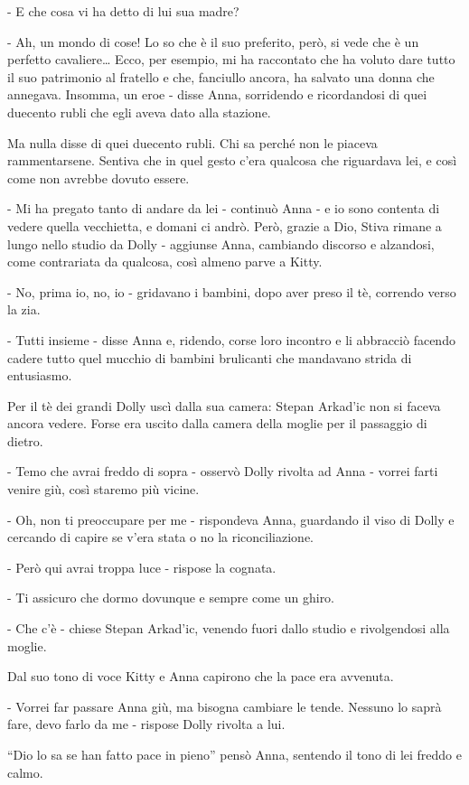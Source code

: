 - E che cosa vi ha detto di lui sua madre? 

- Ah, un mondo di cose! Lo so che è il suo preferito, però, si vede che è un perfetto cavaliere\ldots{} Ecco, per esempio, mi ha raccontato che ha voluto dare tutto il suo patrimonio al fratello e che, fanciullo ancora, ha salvato una donna che annegava. Insomma, un eroe - disse Anna, sorridendo e ricordandosi di quei duecento rubli che egli aveva dato alla stazione. 

Ma nulla disse di quei duecento rubli. Chi sa perché non le piaceva rammentarsene. Sentiva che in quel gesto c'era qualcosa che riguardava lei, e così come non avrebbe dovuto essere. 

- Mi ha pregato tanto di andare da lei - continuò Anna - e io sono contenta di vedere quella vecchietta, e domani ci andrò. Però, grazie a Dio, Stiva rimane a lungo nello studio da Dolly - aggiunse Anna, cambiando discorso e alzandosi, come contrariata da qualcosa, così almeno parve a Kitty. 

- No, prima io, no, io - gridavano i bambini, dopo aver preso il tè, correndo verso la zia. 

- Tutti insieme - disse Anna e, ridendo, corse loro incontro e li abbracciò facendo cadere tutto quel mucchio di bambini brulicanti che mandavano strida di entusiasmo. 

Per il tè dei grandi Dolly uscì dalla sua camera: Stepan Arkad'ic non si faceva ancora vedere. Forse era uscito dalla camera della moglie per il passaggio di dietro. 

- Temo che avrai freddo di sopra - osservò Dolly rivolta ad Anna - vorrei farti venire giù, così staremo più vicine. 

- Oh, non ti preoccupare per me - rispondeva Anna, guardando il viso di Dolly e cercando di capire se v'era stata o no la riconciliazione. 

- Però qui avrai troppa luce - rispose la cognata. 

- Ti assicuro che dormo dovunque e sempre come un ghiro. 

- Che c'è - chiese Stepan Arkad'ic, venendo fuori dallo studio e rivolgendosi alla moglie. 

Dal suo tono di voce Kitty e Anna capirono che la pace era avvenuta. 

- Vorrei far passare Anna giù, ma bisogna cambiare le tende. Nessuno lo saprà fare, devo farlo da me - rispose Dolly rivolta a lui. 

``Dio lo sa se han fatto pace in pieno'' pensò Anna, sentendo il tono di lei freddo e calmo. 

